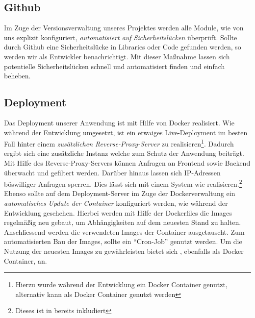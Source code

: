\subsection{Github}

Im Zuge der Versionsverwaltung unseres Projektes werden alle Module, wie von uns explizit konfiguriert, \textit{automatisiert auf Sicherheitslücken} überprüft.
Sollte durch Github eine Sicherheitslücke in Libraries oder Code gefunden werden, so werden wir als Entwickler benachrichtigt.
Mit dieser Maßnahme lassen sich potentielle Sicherheitslücken schnell und automatisiert finden und einfach beheben.\\

\subsection{Deployment}

Das Deployment unserer Anwendung ist mit Hilfe von Docker realisiert.
Wie während der Entwicklung umgesetzt, ist ein etwaiges Live-Deployment im besten Fall hinter einem \textit{zusätzlichen Reverse-Proxy-Server} zu realisieren\footnote{Hierzu wurde während der Entwicklung ein \cite{swag} Docker Container genutzt, alternativ kann \cite{traefik} als Docker Container genutzt werden}.
Dadurch ergibt sich eine zusätzliche Instanz welche zum Schutz der Anwendung beiträgt. Mit Hilfe des Reverse-Proxy-Servers können Anfragen an Frontend sowie Backend überwacht und gefiltert werden.
Darüber hinaus lassen sich IP-Adressen böswilliger Anfragen sperren.
Dies lässt sich mit einem System wie \cite{Fail2Ban} realisieren.\footnote{Dieses ist in \cite{swag} bereits inkludiert}\\
Ebenso sollte auf dem Deployment-Server im Zuge der Dockerverwaltung ein \textit{automatisches Update der Container} konfiguriert werden, wie während der Entwicklung geschehen.
Hierbei werden mit Hilfe der Dockerfiles die Images regelmäßig neu gebaut, um Abhängigkeiten auf dem neuesten Stand zu halten.
Anschliessend werden die verwendeten Images der Container ausgetauscht.
Zum automatisierten Bau der Images, sollte ein \enquote{Cron-Job} genutzt werden.
Um die Nutzung der neuesten Images zu gewährleisten bietet sich \cite{watchtower}, ebenfalls als Docker Container, an.
